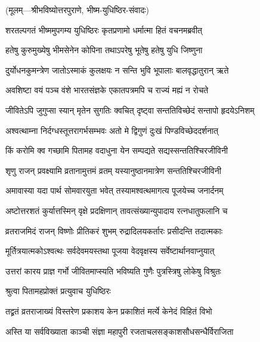 \centerline{\small{(मूलम्—श्रीभविष्योत्तरपुराणे, भीष्म-युधिष्ठिर-संवादः)}}

\twolineshloka
{शरतल्पगतं भीष्ममुपगम्य युधिष्ठिरः}
{कृतप्रणामो धर्मात्मा हितं वचनमब्रवीत्} %


\twolineshloka
{हतेषु कुरुमुख्येषु भीमसेनेन कोपिना}
{तथाऽपरेषु भूतेषु हतेषु युधि जिष्णुना} %

\twolineshloka
{दुर्योधनकुमन्त्रेण जातोऽस्माकं कुलक्षयः}
{न सन्ति भुवि भूपालाः बालवृद्धातुरान् ऋते} %

\twolineshloka
{अवशिष्टा वयं पञ्च वंशे भारतसंज्ञके}
{एकातपत्रमपि च राज्यं मह्यं न रोचते} %

\twolineshloka
{जीवितेऽपि जुगुप्सा स्यान् मृतेन सुगतिः क्वचित्}
{दृष्ट्वा सन्ततिविच्छेदं सन्तापो हृदयेऽनिशम्} %

\twolineshloka
{अश्वत्थाम्ना निर्दग्धस्तूत्तरागर्भसम्भवः}
{अतो मे द्विगुणं दुःखं पिण्डविच्छेददर्शनात्} %

\twolineshloka
{किं करोमि क्व गच्छामि पितामह वदाधुना}
{येन सम्पद्यते सद्यस्सन्ततिश्चिरजीविनी} %


\twolineshloka
{शृणु राजन् प्रवक्ष्यामि व्रतानामुत्तमं व्रतम्}
{यस्यानुष्ठानमात्रेण सन्ततिश्चिरजीविनी} %

\twolineshloka
{अमावास्या यदा पार्थ सोमवारयुता भवेत्}
{तस्यामश्वत्थमागत्य पूजयेच्च जनार्दनम्} %

\twolineshloka
{अष्टोत्तरशतं कुर्यात्तस्मिन् वृक्षे प्रदक्षिणान्}
{तावत्संख्यान्युपादाय रत्नधातुफलानि च} %

\twolineshloka
{व्रतराजमिदं राजन् विष्णोः प्रीतिकरं शुभम्}
{रुद्रादिलयकर्तारः प्रसीदन्ति तदात्मकाः} %

\twolineshloka
{मूर्तित्रयात्मकोऽश्वत्थः सर्वदेवमयस्तथा}
{पूजया वेदवृक्षस्य सर्वेष्टार्थानवाप्नुयात्} %

\twolineshloka
{उत्तरां कारय प्राज्ञ गर्भो जीवितमाप्स्यति}
{भविष्यति गुणैः पुत्रस्त्रिषु लोकेषु विश्रुतः} %

\onelineshloka
{श्रुत्वा पितामहप्रोक्तं प्रत्युवाच युधिष्ठिरः} %


\twolineshloka
{तद्व्रतं व्रतराजाख्यं विस्तरेण प्रकाशय}
{केन प्रकाशितं मर्त्ये केनेदं विहितं विभो} %


\twolineshloka
{अस्ति या सर्वविख्याता काञ्ची संज्ञा महापुरी}
{रजताचलसङ्काशसौधसन्धैर्विराजिता} %

